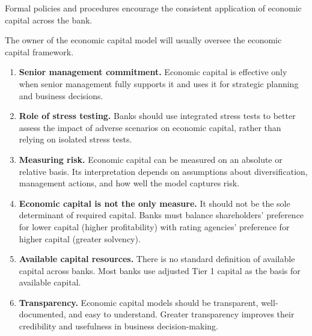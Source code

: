 \begin{checks}
\item Formal policies and procedures encourage the consistent application of
economic capital across the bank.
\item The owner of the economic capital model will usually oversee the economic
capital framework.
\end{checks}


\begin{enumerate}
\item[\textcolor{rust}{\sffamily\bfseries 1.}] \textbf{Senior management
commitment.} Economic capital is effective only when senior management fully
supports it and uses it for strategic planning and business decisions.
\item[\textcolor{rust}{\sffamily\bfseries 2.}] \textbf{Role of stress testing.}
Banks should use integrated stress tests to better assess the impact of adverse
scenarios on economic capital, rather than relying on isolated stress tests.
\item[\textcolor{rust}{\sffamily\bfseries 3.}] \textbf{Measuring risk.} Economic
capital can be measured on an absolute or relative basis. Its interpretation
depends on assumptions about diversification, management actions, and how well the
model captures risk.
\item[\textcolor{rust}{\sffamily\bfseries 4.}] \textbf{Economic capital is not the
only measure.} It should not be the sole determinant of required capital. Banks
must balance shareholders' preference for lower capital (higher profitability) with
rating agencies' preference for higher capital (greater solvency).
\item[\textcolor{rust}{\sffamily\bfseries 5.}] \textbf{Available capital
resources.} There is no standard definition of available capital across banks. Most
banks use adjusted Tier 1 capital as the basis for available capital.
\item[\textcolor{rust}{\sffamily\bfseries 6.}] \textbf{Transparency.} Economic
capital models should be transparent, well-documented, and easy to understand.
Greater transparency improves their credibility and usefulness in business
decision-making.
\end{enumerate}
